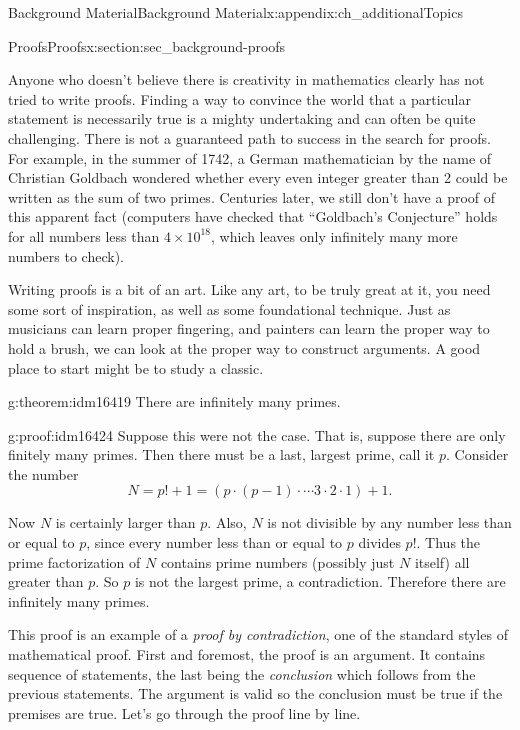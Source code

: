 \documentclass[oneside,10pt,]{book}
\numberwithin{equation}{chapter}
\begin{document}
\begin{appendixptx}{Background Material}{}{Background Material}{}{}{x:appendix:ch_additionalTopics}
\begin{sectionptx}{Proofs}{}{Proofs}{}{}{x:section:sec_background-proofs}
\begin{introduction}{}
Anyone who doesn't believe there is creativity in mathematics clearly has not tried to write proofs. Finding a way to convince the world that a particular statement is necessarily true is a mighty undertaking and can often be quite challenging. There is not a guaranteed path to success in the search for proofs. For example, in the summer of 1742, a German mathematician by the name of Christian Goldbach wondered whether every even integer greater than 2 could be written as the sum of two primes. Centuries later, we still don't have a proof of this apparent fact (computers have checked that ``Goldbach's Conjecture'' holds for all numbers less than \(4\times 10^{18}\), which leaves only infinitely many more numbers to check).%
\par
Writing proofs is a bit of an art. Like any art, to be truly great at it, you need some sort of inspiration, as well as some foundational technique. Just as musicians can learn proper fingering, and painters can learn the proper way to hold a brush, we can look at the proper way to construct arguments. A good place to start might be to study a classic.%
\begin{theorem}{}{}{g:theorem:idm16419}%
There are infinitely many primes.%
\end{theorem}
\begin{proofptx}{}{g:proof:idm16424}
Suppose this were not the case. That is, suppose there are only finitely many primes. Then there must be a last, largest prime, call it \(p\). Consider the number%
\begin{equation*}
N = p! + 1 = (p \cdot (p-1) \cdot \cdots 3\cdot 2 \cdot 1) + 1.
\end{equation*}
%
\par
Now \(N\) is certainly larger than \(p\). Also, \(N\) is not divisible by any number less than or equal to \(p\), since every number less than or equal to \(p\) divides \(p!\). Thus the prime factorization of \(N\) contains prime numbers (possibly just \(N\) itself) all greater than \(p\). So \(p\) is not the largest prime, a contradiction. Therefore there are infinitely many primes.%
\end{proofptx}
This proof is an example of a \emph{proof by contradiction}, one of the standard styles of mathematical proof. First and foremost, the proof is an argument. It contains sequence of statements, the last being the \emph{conclusion} which follows from the previous statements. The argument is valid so the conclusion must be true if the premises are true. Let's go through the proof line by line.%

\end{introduction}
\end{sectionptx}
\end{appendixptx}
\end{document}

